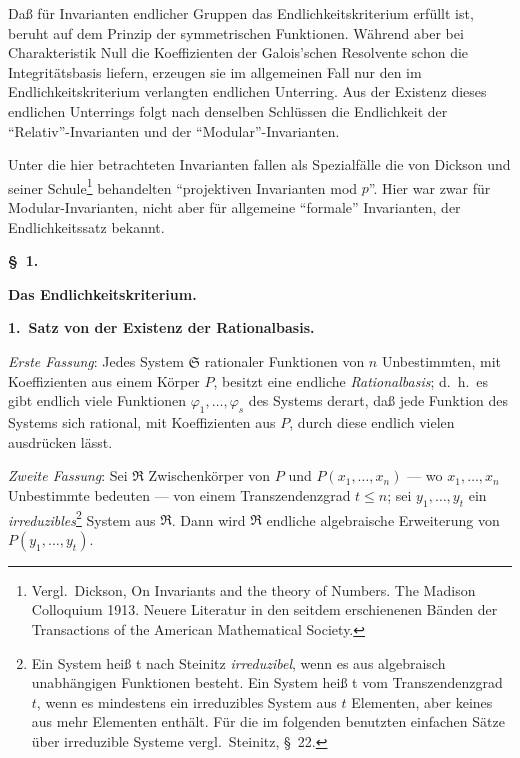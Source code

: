 \documentclass[12pt,a4paper]{article}
\begin{document}
{{Da{\ss} f\"{u}r Invarianten endlicher Gruppen das Endlichkeitskriterium
erf\"{u}llt ist, beruht auf dem Prinzip der symmetrischen Funktionen.
W\"{a}hrend aber bei Charakteristik Null die Koeffizienten der Galois'schen
Resolvente schon die Integrit\"{a}tsbasis liefern, erzeugen sie im allgemeinen
Fall nur den im Endlichkeitskriterium verlangten endlichen Unterring.
Aus der Existenz dieses endlichen Unterrings folgt nach denselben
Schl\"{u}ssen die Endlichkeit der ``Relativ''-Invarianten und der ``Modular''-Invarianten.

Unter die hier betrachteten Invarianten fallen als Spezialf\"{a}lle
die von Dickson und seiner Schule\footnote{Vergl.\ Dickson, On Invariants and the theory of Numbers.
The Madison Colloquium 1913. Neuere Literatur in den seitdem erschienenen B\"{a}nden
der Transactions of the American Mathematical Society.} behandelten ``projektiven
Invarianten mod $p$''. Hier war zwar f\"{u}r Modular-Invarianten, nicht
aber f\"{u}r allgemeine ``formale'' Invarianten, der Endlichkeitssatz bekannt.

\medskip
\noindent\textbf{\S~1.}
\medskip

\noindent\textbf{Das Endlichkeitskriterium.}
\medskip

\textbf{1.\ Satz von der Existenz der Rationalbasis.}

\textit{Erste Fassung}: Jedes System $\mathfrak{S}$ rationaler Funktionen von $n$ Unbestimmten,
mit Koeffizienten aus einem K\"{o}rper $P$, besitzt eine endliche \textit{Rationalbasis};
d.~h.\ es gibt endlich viele Funktionen $\varphi_{1},\dots,\varphi_{s}$ des Systems derart,
da{\ss} jede Funktion des Systems sich rational, mit Koeffizienten aus $P$,
durch diese endlich vielen ausdr\"{u}cken l\"{a}sst.

\textit{Zweite Fassung}: Sei $\mathfrak{R}$ Zwischenk\"{o}rper von $P$ und $P(x_{1},\dots,x_{n})$
--- wo $x_{1},\dots,x_{n}$ Unbestimmte bedeuten --- von einem Transzendenzgrad
$t\leq n$; sei $y_{1},\dots,y_{t}$ ein \textit{irreduzibles}\footnote{Ein System hei{\ss} t nach Steinitz \textit{irreduzibel}, wenn es aus algebraisch
unabh\"{a}ngigen Funktionen besteht. Ein System hei{\ss} t vom Transzendenzgrad $t$,
 wenn es mindestens ein irreduzibles System aus $t$ Elementen, aber keines aus
mehr Elementen enth\"{a}lt. F\"{u}r die im folgenden benutzten einfachen S\"{a}tze \"{u}ber
irreduzible Systeme vergl.\ Steinitz, \S~22.} System aus $\mathfrak{R}$.
Dann wird $\mathfrak{R}$ endliche algebraische Erweiterung von $P(y_{1},\dots,y_{t})$.

}}
\end{document}
